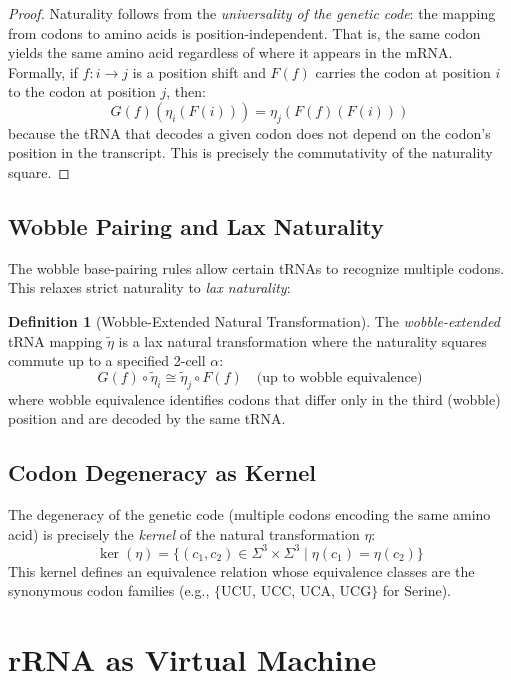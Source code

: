 \documentclass[12pt,a4paper]{article}
\theoremstyle{definition}
\newtheorem{definition}[theorem]{Definition}
\begin{document}
\begin{proof}
Naturality follows from the \emph{universality of the genetic code}:
the mapping from codons to amino acids is position-independent.  That
is, the same codon yields the same amino acid regardless of where it
appears in the mRNA.  Formally, if $f : i \to j$ is a position shift
and $F(f)$ carries the codon at position $i$ to the codon at position
$j$, then:
\[
  G(f)(\eta_i(F(i))) = \eta_j(F(f)(F(i)))
\]
because the tRNA that decodes a given codon does not depend on
the codon's position in the transcript.  This is precisely the
commutativity of the naturality square.
\end{proof}

\subsection{Wobble Pairing and Lax Naturality}

The wobble base-pairing rules allow certain tRNAs to recognize multiple
codons.  This relaxes strict naturality to \emph{lax naturality}:

\begin{definition}[Wobble-Extended Natural Transformation]
The \emph{wobble-extended} tRNA mapping $\tilde{\eta}$ is a lax natural
transformation where the naturality squares commute up to a specified
2-cell $\alpha$:
\[
  G(f) \circ \tilde{\eta}_i \cong \tilde{\eta}_j \circ F(f)
  \quad \text{(up to wobble equivalence)}
\]
where wobble equivalence identifies codons that differ only in the
third (wobble) position and are decoded by the same tRNA.
\end{definition}

\subsection{Codon Degeneracy as Kernel}

The degeneracy of the genetic code (multiple codons encoding the same
amino acid) is precisely the \emph{kernel} of the natural
transformation $\eta$:
\[
  \ker(\eta) = \{(c_1, c_2) \in \Sigma^3 \times \Sigma^3 \mid
    \eta(c_1) = \eta(c_2)\}
\]
This kernel defines an equivalence relation whose equivalence classes
are the synonymous codon families (e.g., $\{$UCU, UCC, UCA, UCG$\}$
for Serine).

\section{rRNA as Virtual Machine}\label{sec:rrna}
\end{document}

